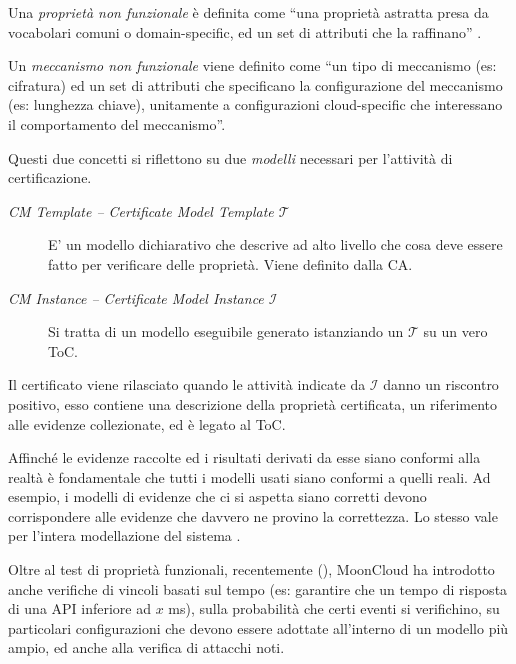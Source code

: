 Una \textit{proprietà non funzionale} è definita
come ``una proprietà astratta presa da vocabolari comuni o domain-specific, ed un set
di attributi che la raffinano'' \cite{mooncloud-semi-automatic-and-trustworthy}.

Un \textit{meccanismo non funzionale} viene definito come ``un tipo di meccanismo (es: cifratura)
ed un set di attributi che specificano la configurazione del meccanismo (es: lunghezza chiave),
unitamente a configurazioni cloud-specific che interessano il comportamento del
meccanismo''\cite{mooncloud-semi-automatic-and-trustworthy}.

Questi due concetti si riflettono su due \textit{modelli} necessari per l'attività di
certificazione.
\begin{description}
	\item[\textit{CM Template -- Certificate Model Template $\mathcal{T}$}]E' un modello dichiarativo che
	descrive ad alto livello che cosa deve essere fatto per verificare delle proprietà.
	Viene definito dalla CA.
	\item[\textit{CM Instance -- Certificate Model Instance $\mathcal{I}$}]Si tratta di un modello 
	eseguibile generato istanziando un $\mathcal{T}$ su un vero ToC.
\end{description}
Il certificato viene rilasciato quando le attività indicate da $\mathcal{I}$ danno un
riscontro positivo, esso contiene una descrizione della proprietà certificata,
un riferimento alle evidenze collezionate, ed è legato al ToC.


Affinché le evidenze raccolte ed i risultati derivati da esse siano conformi alla
realtà è fondamentale che tutti i modelli usati siano conformi a quelli reali. Ad esempio,
i modelli di evidenze che ci si aspetta siano corretti devono corrispondere alle
evidenze che davvero ne provino la correttezza. Lo stesso vale per l'intera modellazione
del sistema \cite{mooncloud-modelling-time}.

Oltre al test di proprietà funzionali, recentemente (\cite{mooncloud-modelling-time}),
MoonCloud ha introdotto anche verifiche di vincoli basati sul tempo (es: garantire che
un tempo di risposta di una API inferiore ad $x$ ms), sulla probabilità che
certi eventi si verifichino, su particolari configurazioni che devono essere adottate
all'interno di un modello più ampio, ed anche alla verifica di attacchi noti.